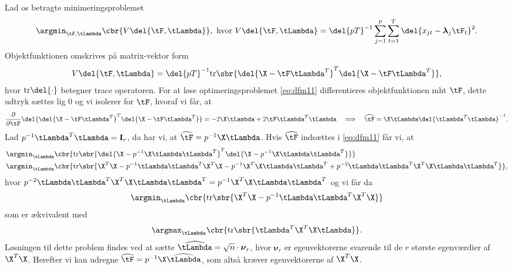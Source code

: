 Lad os betragte minimeringsproblemet
\begin{align}
\argmin_{\tF, \tLambda} \cbr{V \del{\tF, \tLambda}}, \text{ hvor } V \del{\tF, \tLambda} = \del{pT}^{-1} \sum_{j=1}^p \sum_{t=1}^T \del{x_{jt} - \boldsymbol{\lambda}_j \tF_t}^2.  \label{eq:dfm11}
\end{align}
Objektfunktionen omskrives på matrix-vektor form
\begin{align*}
V \del{\tF, \tLambda} = \del{pT}^{-1} \text{tr} \sbr{ \del{\X - \tF \tLambda^T}^T \del{\X - \tF \tLambda^T}},
\end{align*}
hvor \(\text{tr} \del{\cdot}\) betegner trace operatoren.
For at løse optimeringsproblemet \eqref{eq:dfm11} differentieres objektfunktionen mht \(\tF\), dette udtryk sættes lig 0 og vi isolerer for \(\tF\), hvoraf vi får, at
\begin{align*}
\frac{\partial}{\partial \tF} \del{\del{\X - \tF \tLambda^T}^T \del{\X - \tF \tLambda^T}} = -2 \X \tLambda + 2 \tF \tLambda^T \tLambda \quad \Longrightarrow \quad \widehat{\tF} = \X \tLambda \del{\tLambda^T \tLambda}^{-1} .
\end{align*}
Lad \(p^{-1} \tLambda^T \tLambda = \mathbf{I}_r\), da har vi, at \(\widehat{\tF} = p^{-1} \X \tLambda\).
Hvis \(\widehat{\tF}\) indsættes i \eqref{eq:dfm11} får vi, at
\begin{align*}
&\argmin_{\tLambda} \cbr{\text{tr} \sbr{ \del{\X - p^{-1} \X \tLambda \tLambda^T}^T \del{\X - p^{-1} \X \tLambda \tLambda^T}}} \\
&\argmin_{\tLambda} \cbr{ \text{tr} \sbr{\X^T \X - p^{-1} \tLambda \tLambda^T \X^T \X - p^{-1} \X^T \X \tLambda \tLambda^T + p^{-2} \tLambda \tLambda^T \X^T \X \tLambda \tLambda^T}},
\end{align*}
hvor \(p^{-2} \tLambda \tLambda^T \X^T \X \tLambda \tLambda^T = p^{-1} \X^T \X \tLambda \tLambda^T\) og vi får da
\begin{align*}
\argmin_{\tLambda} \cbr{ \text{tr} \sbr{\X^T \X - p^{-1} \tLambda \tLambda^T \X^T \X}}
\end{align*}
som er ækvivalent med
\begin{align*}
\argmax_{\tLambda} \cbr{ \text{tr} \sbr{\tLambda^T \X^T \X \tLambda}}.
\end{align*}
Løsningen til dette problem findes ved at sætte \(\widehat{\tLambda} =\sqrt{n} \cdot \boldsymbol{\nu}_r\), hvor \(\boldsymbol{\nu}_r\) er egenvektorerne svarende til de \(r\) største egenværdier af \(\X^T \X\).
Herefter vi kan udregne \(\widehat{\tF} = p^{-1} \X \widehat{\tLambda}\), som altså kræver egenvektorerne af \(\X^T \X\).

